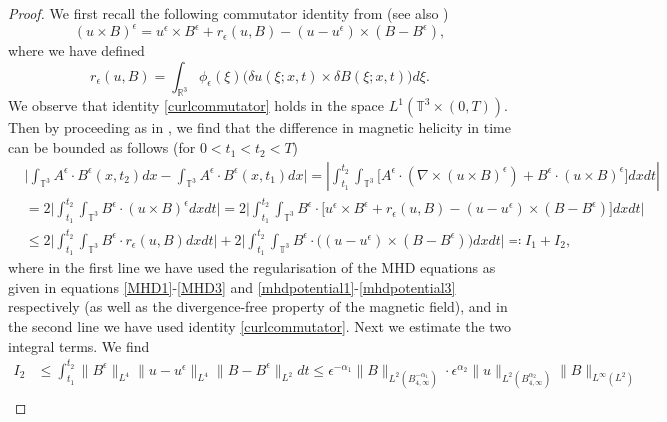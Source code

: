 \documentclass[12pt,a4paper]{article}
\theoremstyle{definition}
\theoremstyle{remark}
\numberwithin{equation}{section}
\begin{document}
\begin{proof}
We first recall the following commutator identity from \cite{kang} (see also \cite{titi2018})
\begin{equation} \label{curlcommutator}
(u \times B)^\epsilon = u^\epsilon \times B^\epsilon + r_\epsilon (u,B) - (u - u^\epsilon) \times (B - B^\epsilon),
\end{equation}
where we have defined
\begin{equation} \label{repsilondef}
r_\epsilon (u,B) = \int_{\mathbb{R}^3} \phi_\epsilon (\xi) \big( \delta u (\xi ; x,t) \times \delta B (\xi ; x,t) \big) d \xi. 
\end{equation}
We observe that identity \eqref{curlcommutator} holds in the space $L^1 (\mathbb{T}^3 \times (0,T))$. Then by proceeding as in \cite{kang}, we find that the difference in magnetic helicity in time can be bounded as follows (for $0 < t_1 < t_2 < T$)
\begin{align*}
&\bigg\lvert \int_{\mathbb{T}^3} A^\epsilon \cdot B^\epsilon (x,t_2) dx - \int_{\mathbb{T}^3} A^\epsilon \cdot B^\epsilon (x,t_1) dx \bigg\rvert = \left\lvert \int_{t_1}^{t_2} \int_{\mathbb{T}^3} \bigg[ A^\epsilon \cdot (\nabla \times (u \times B)^\epsilon) + B^\epsilon \cdot (u \times B)^\epsilon \bigg] dx dt \right\rvert \\
&= 2 \bigg\lvert \int_{t_1}^{t_2} \int_{\mathbb{T}^3}  B^\epsilon \cdot (u \times B)^\epsilon dx dt \bigg\rvert = 2 \bigg\lvert \int_{t_1}^{t_2} \int_{\mathbb{T}^3} B^\epsilon \cdot \big[ u^\epsilon \times B^\epsilon + r_\epsilon (u,B) - (u - u^\epsilon) \times (B - B^\epsilon) \big] dx dt \bigg\rvert \\
&\leq 2 \bigg\lvert \int_{t_1}^{t_2} \int_{\mathbb{T}^3} B^\epsilon \cdot  r_\epsilon (u,B)  dx dt \bigg\rvert + 2 \bigg\lvert \int_{t_1}^{t_2} \int_{\mathbb{T}^3} B^\epsilon \cdot \big( (u - u^\epsilon) \times (B - B^\epsilon) \big) dx dt \bigg\rvert \eqqcolon I_1 + I_2,
\end{align*}
where in the first line we have used the regularisation of the MHD equations as given in equations \eqref{MHD1}-\eqref{MHD3} and \eqref{mhdpotential1}-\eqref{mhdpotential3} respectively (as well as the divergence-free property of the magnetic field), and in the second line we have used identity \eqref{curlcommutator}. Next we estimate the two integral terms. We find
\begin{align*}
I_2 &\leq \int_{t_1}^{t_2} \lVert B^\epsilon \rVert_{L^4} \lVert u - u^\epsilon \rVert_{L^4} \lVert B - B^\epsilon \rVert_{L^2} dt \leq \epsilon^{-\alpha_1} \lVert B \rVert_{L^2 (B^{-\alpha_1}_{4,\infty})} \cdot \epsilon^{\alpha_2} \lVert u \rVert_{L^2 (B^{\alpha_2}_{4,\infty})} \lVert B \rVert_{L^\infty (L^2)} \\

\end{align*}
\end{proof}
\end{document}
